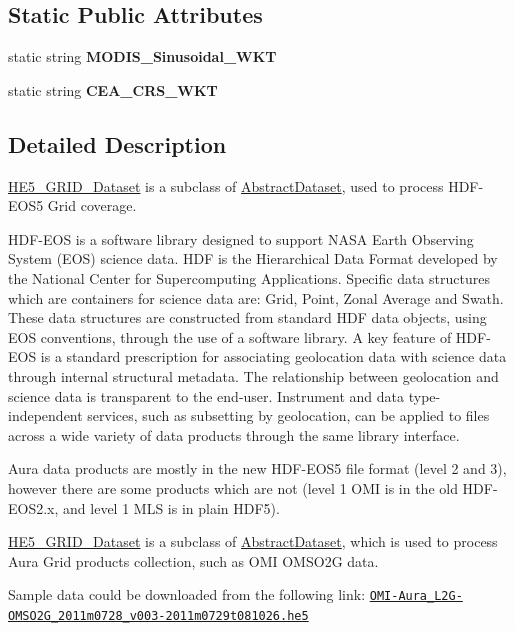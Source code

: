 \subsection*{Static Public Attributes}
\begin{DoxyCompactItemize}
\item 
static string {\bfseries MODIS\_\-Sinusoidal\_\-WKT}
\item 
static string {\bfseries CEA\_\-CRS\_\-WKT}
\end{DoxyCompactItemize}


\subsection{Detailed Description}
\hyperlink{classHE5__GRID__Dataset}{HE5\_\-GRID\_\-Dataset} is a subclass of \hyperlink{classAbstractDataset}{AbstractDataset}, used to process HDF-\/EOS5 Grid coverage. 

HDF-\/EOS is a software library designed to support NASA Earth Observing System (EOS) science data. HDF is the Hierarchical Data Format developed by the National Center for Supercomputing Applications. Specific data structures which are containers for science data are: Grid, Point, Zonal Average and Swath. These data structures are constructed from standard HDF data objects, using EOS conventions, through the use of a software library. A key feature of HDF-\/EOS is a standard prescription for associating geolocation data with science data through internal structural metadata. The relationship between geolocation and science data is transparent to the end-\/user. Instrument and data type-\/independent services, such as subsetting by geolocation, can be applied to files across a wide variety of data products through the same library interface.

Aura data products are mostly in the new HDF-\/EOS5 file format (level 2 and 3), however there are some products which are not (level 1 OMI is in the old HDF-\/EOS2.x, and level 1 MLS is in plain HDF5).

\hyperlink{classHE5__GRID__Dataset}{HE5\_\-GRID\_\-Dataset} is a subclass of \hyperlink{classAbstractDataset}{AbstractDataset}, which is used to process Aura Grid products collection, such as OMI OMSO2G data.

Sample data could be downloaded from the following link: \href{ftp://acdisc.gsfc.nasa.gov/data/s4pa///Aura_OMI_Level2G/OMSO2G.003//2011/OMI-Aura_L2G-OMSO2G_2011m0728_v003-2011m0729t081026.he5}{\tt OMI-\/Aura\_\-L2G-\/OMSO2G\_\-2011m0728\_\-v003-\/2011m0729t081026.he5} 

